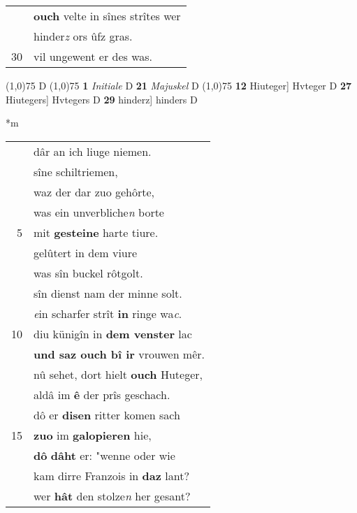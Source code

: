 \documentclass[8pt,a4paper,notitlepage]{article}
\begin{document}
\begin{table}[ht]
\begin{minipage}[t]{0.5\linewidth}
\begin{tabular}{rl}
 & \textbf{ouch} velte in sînes strîtes wer\\ 
 & hinder\textit{z} ors ûfz gras.\\ 
30 & vil ungewent er des was.\\ 
\end{tabular}
\scriptsize
\line(1,0){75} \newline
D \newline
\line(1,0){75} \newline
\textbf{1} \textit{Initiale} D  \textbf{21} \textit{Majuskel} D  \newline
\line(1,0){75} \newline
\textbf{12} Hiuteger] Hvteger D \textbf{27} Hiutegers] Hvtegers D \textbf{29} hinderz] hinders D \newline
\end{minipage}
\hspace{0.5cm}
\begin{minipage}[t]{0.5\linewidth}
\small
\begin{center}*m
\end{center}
\begin{tabular}{rl}
 & dâr an ich liuge niemen.\\ 
 & sîne schiltriemen,\\ 
 & waz der dar zuo gehôrte,\\ 
 & was ein unverbliche\textit{n} borte\\ 
5 & mit \textbf{gesteine} harte tiure.\\ 
 & gelûtert in dem viure\\ 
 & was sîn buckel rôtgolt.\\ 
 & sîn dienst nam der minne solt.\\ 
 & \textit{e}in scharfer strît \textbf{in} ringe wa\textit{c}.\\ 
10 & diu künigîn in \textbf{dem venster} lac\\ 
 & \textbf{und saz ouch bî ir} vrouwen mêr.\\ 
 & nû sehet, dort hielt \textbf{ouch} Huteger,\\ 
 & aldâ im \textbf{ê} der prîs geschach.\\ 
 & dô er \textbf{disen} ritter komen sach\\ 
15 & \textbf{zuo} im \textbf{galopieren} hie,\\ 
 & \textbf{dô} \textbf{dâht} er: "wenne oder wie\\ 
 & kam dirre Franzois in \textbf{daz} lant?\\ 
 & wer \textbf{hât} den stolze\textit{n} her gesant?\\ 

\end{tabular}
\end{minipage}
\end{table}
\end{document}
